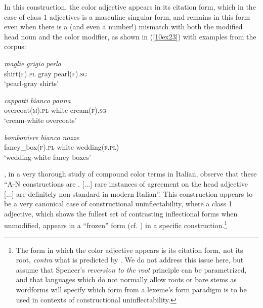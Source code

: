 \documentclass[output=paper,colorlinks,citecolor=brown]{langscibook}
\begin{document}

In this construction, the color adjective appears in its citation form, which in the case of class 1 adjectives is a masculine singular form, and remains in this form even when there is a  (and even a number!) mismatch with both the modified head noun and the color modifier, as shown in (\ref{10ex23}) with examples from the 
corpus:

\begin{exe}
	\ex \label{10ex23}
	\begin{xlist}
		\ex 
		\gll \emph{maglie} \emph{grigio} \emph{perla} \\
		shirt(\textsc{f}).\textsc{pl} gray pearl(\textsc{f}).\textsc{sg} \\
		\trans ‘pearl-gray shirts’
		
		\ex 
		\gll \emph{cappotti} \emph{bianco} \emph{panna} \\
		overcoat(\textsc{m}).\textsc{pl} white cream(\textsc{f}).\textsc{sg} \\
		\trans ‘cream-white overcoats’
		
		\ex 
		\gll \emph{bomboniere} \emph{bianco} \emph{nozze} \\
		fancy\_box(\textsc{f}).\textsc{pl} white wedding(\textsc{f.pl})\footnotemark \\
		\trans ‘wedding-white fancy boxes’
	\end{xlist}
\end{exe}


\citet[77]{grossmanndachille2019}, in a very thorough study of compound color terms in Italian, observe that these ``A-N constructions are . [...] rare instances of agreement on the head adjective [...] are definitely non-standard in modern Italian''. This construction appears to be a very canonical case of constructional uninflectability, where a class 1 adjective, which shows the fullest set of contrasting inflectional forms when unmodified, appears in a ``frozen'' form (cf. \citealt{audring2023}) in a specific construction.\footnote{The form in which the color adjective appears is its citation form, not its root, \emph{contra} what is predicted by \citet{spencer2020}. We do not address this issue here, but assume that Spencer's \textit{reversion to the root} principle can be parametrized, and that languages which do not normally allow roots or bare stems as wordforms will specify which form from a lexeme's form paradigm is to be used in contexts of constructional uninflectability.}
\end{document}
